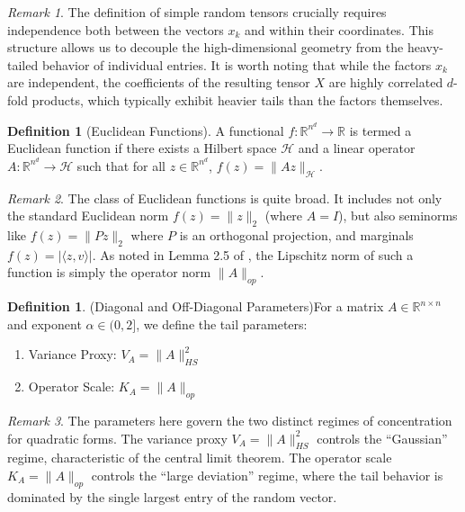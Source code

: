 \documentclass[11pt]{amsart}
\theoremstyle{definition}
\newtheorem{definition}[theorem]{Definition}
\theoremstyle{remark}
\newtheorem*{remark}{Remark}
\begin{document}
\begin{remark}
The definition of simple random tensors crucially requires independence both between the vectors $x_k$ and within their coordinates. This structure allows us to decouple the high-dimensional geometry from the heavy-tailed behavior of individual entries. It is worth noting that while the factors $x_k$ are independent, the coefficients of the resulting tensor $X$ are highly correlated $d$-fold products, which typically exhibit heavier tails than the factors themselves.
\end{remark}

\begin{definition}[Euclidean Functions]\label{def:2.3}
A functional $f: \mathbb{R}^{n^d} \to \mathbb{R}$ is termed a Euclidean function if there exists a Hilbert space $\mathcal{H}$ and a linear operator $A: \mathbb{R}^{n^d} \to \mathcal{H}$ such that for all $z \in \mathbb{R}^{n^d}$, $f(z) = \|Az\|_\mathcal{H}$.
\end{definition}

\begin{remark}
The class of Euclidean functions is quite broad. It includes not only the standard Euclidean norm $f(z)=\|z\|_2$ (where $A=I$), but also seminorms like $f(z)=\|Pz\|_2$ where $P$ is an orthogonal projection, and marginals $f(z)=|\langle z, v \rangle|$. As noted in Lemma 2.5 of \cite{Vershynin2020}, the Lipschitz norm of such a function is simply the operator norm $\|A\|_{op}$.
\end{remark}

\begin{definition}(Diagonal and Off-Diagonal Parameters)\label{def:2.4}
For a matrix $A \in \mathbb{R}^{n \times n}$ and exponent $\alpha \in(0,2]$, we define the tail parameters:
\begin{enumerate}
    \item Variance Proxy: $V_A=\|A\|_{H S}^2$
    \item Operator Scale: $K_A=\|A\|_{o p}$
\end{enumerate}

\end{definition}

\begin{remark}
The parameters here govern the two distinct regimes of concentration for quadratic forms. The variance proxy $V_A = \|A\|_{HS}^2$ controls the ``Gaussian'' regime, characteristic of the central limit theorem. The operator scale $K_A = \|A\|_{op}$ controls the ``large deviation'' regime, where the tail behavior is dominated by the single largest entry of the random vector.
\end{remark}
\end{document}
